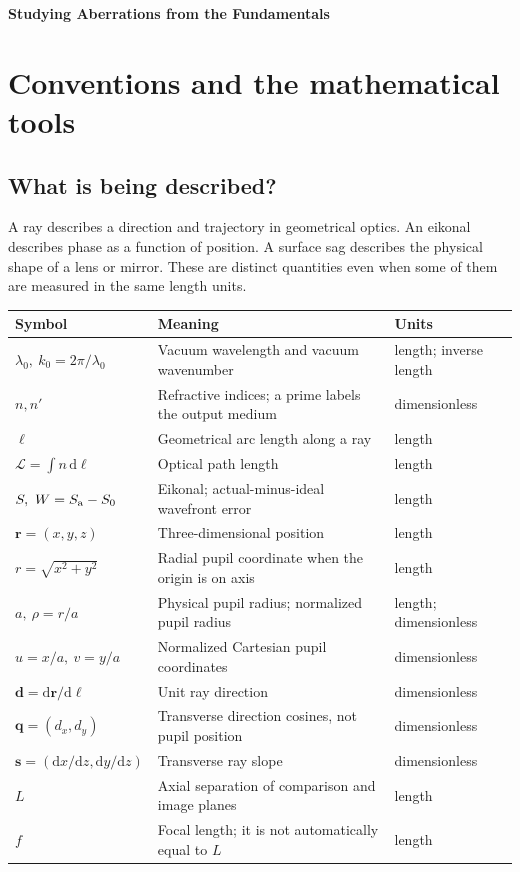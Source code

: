 \documentclass[11pt,a4paper]{article}
\numberwithin{equation}{section}
\newcommand{\dd}{\mathrm{d}}
\newcommand{\vct}[1]{\bm{#1}}
\begin{document}
\hypersetup{pageanchor=false}
{\color{ink}\Huge\bfseries Studying Aberrations from the Fundamentals}
\vspace{7mm}
\hypersetup{pageanchor=true}


\section{Conventions and the mathematical tools}
\subsection{What is being described?}
A ray describes a direction and trajectory in geometrical optics. An
eikonal describes phase as a function of position. A surface sag describes
the physical shape of a lens or mirror. These are distinct quantities even
when some of them are measured in the same length units.

\begin{longtable}{@{}>{\raggedright\arraybackslash}p{}>{\raggedright\arraybackslash}p{}>{\raggedright\arraybackslash}p{}@{}}
\toprule
Symbol & Meaning & Units\\ \midrule
\endhead
$\lambda_0,\ k_0=2\pi/\lambda_0$ & Vacuum wavelength and vacuum wavenumber & length; inverse length\\
$n,n'$ & Refractive indices; a prime labels the output medium & dimensionless\\
$\ell$ & Geometrical arc length along a ray & length\\
$\mathcal L=\int n\,\dd\ell$ & Optical path length & length\\
$S,\ W=S_{\rm a}-S_0$ & Eikonal; actual-minus-ideal wavefront error & length\\
$\vct r=(x,y,z)$ & Three-dimensional position & length\\
$r=\sqrt{x^2+y^2}$ & Radial pupil coordinate when the origin is on axis & length\\
$a,\ \rho=r/a$ & Physical pupil radius; normalized pupil radius & length; dimensionless\\
$u=x/a,\ v=y/a$ & Normalized Cartesian pupil coordinates & dimensionless\\
$\vct d=\dd\vct r/\dd\ell$ & Unit ray direction & dimensionless\\
$\vct q=(d_x,d_y)$ & Transverse direction cosines, not pupil position & dimensionless\\
$\vct s=(\dd x/\dd z,\dd y/\dd z)$ & Transverse ray slope & dimensionless\\
$L$ & Axial separation of comparison and image planes & length\\
$f$ & Focal length; it is not automatically equal to $L$ & length\\
\bottomrule
\end{longtable}
\end{document}
